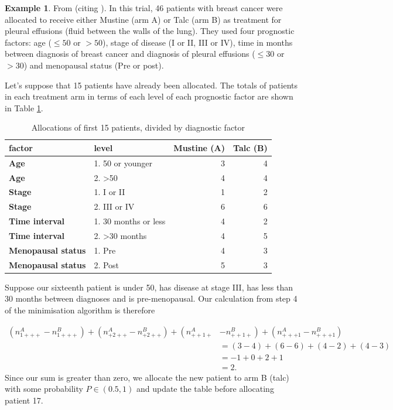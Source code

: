 \documentclass[
  openany]{book}
\theoremstyle{definition}
\theoremstyle{definition}
\newtheorem{example}{Example}[chapter]
\theoremstyle{definition}
\theoremstyle{definition}
\theoremstyle{remark}
\begin{document}
\begin{example}
\protect\hypertarget{exm:mustine}{}\label{exm:mustine}From \citet{altman1990practical} (citing \citet{fentiman1983control}).
In this trial, 46 patients with breast cancer were allocated to receive either Mustine (arm A) or Talc (arm B) as treatment for pleural effusions (fluid between the walls of the lung). They used four prognostic factors: age (\(\leq{50}\) or \(>50\)), stage of disease (I or II, III or IV), time in months between diagnosis of breast cancer and diagnosis of pleural effusions (\(\leq{30}\) or \(>30\)) and menopausal status (Pre or post).

Let's suppose that 15 patients have already been allocated. The totals of patients in each treatment arm in terms of each level of each prognostic factor are shown in Table \ref{tab:minimeg}.

\begin{table}

\caption{\label{tab:minimeg}Allocations of first 15 patients, divided by diagnostic factor}
\centering
\begin{tabular}[t]{>{}l|l|r|r}
\hline
factor & level & Mustine (A) & Talc (B)\\
\hline
\textbf{Age} & 1. 50 or younger & 3 & 4\\
\hline
\textbf{Age} & 2. >50 & 4 & 4\\
\hline
\textbf{Stage} & 1. I or II & 1 & 2\\
\hline
\textbf{Stage} & 2. III or IV & 6 & 6\\
\hline
\textbf{Time interval} & 1. 30 months or less & 4 & 2\\
\hline
\textbf{Time interval} & 2. >30 months & 4 & 5\\
\hline
\textbf{Menopausal status} & 1. Pre & 4 & 3\\
\hline
\textbf{Menopausal status} & 2. Post & 5 & 3\\
\hline
\end{tabular}
\end{table}

Suppose our sixteenth patient is under 50, has disease at stage III, has less than 30 months between diagnoses and is pre-menopausal.
Our calculation from step 4 of the minimisation algorithm is therefore

\[
\begin{aligned}
\left(n^A_{1+++} - n^B_{1+++}\right) + \left(n^A_{+2++} - n^B_{+2++}\right) + \left(n^A_{++1+} \right.& \left.- n^B_{++1+}\right) + \left(n^A_{+++1} - n^B_{+++1}\right) \\
& = \left(3-4\right) + \left(6-6\right) + \left(4-2\right) + \left(4-3\right) \\
& = -1 + 0 + 2 + 1\\
& = 2 .
\end{aligned}
\]
Since our sum is greater than zero, we allocate the new patient to arm B (talc) with some probability \(P\in\left(0.5,1\right)\) and update the table before allocating patient 17.
\end{example}
\end{document}
